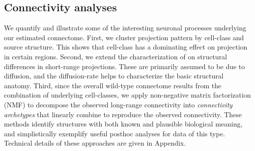 \documentclass[NETN,manuscript]{stjour-new}
\begin{document}


\subsection{Connectivity analyses}

We quantify and illustrate some of the interesting neuronal processes underlying our estimated connectome.
First, we cluster projection pattern by cell-class and source structure.
This shows that cell-class has a dominating effect on projection in certain regions.
Second, we extend the characterization of \citet{Knox2019-ot} on structural differences in short-range projections.
These are primarily assumed to be due to diffusion, and the diffusion-rate helps to characterize the basic structural anatomy.
Third, since the overall wild-type connectome results from the combination of underlying cell-classes, we apply non-negative matrix factorization (NMF) to decompose the observed long-range connectivity into \textit{connectivity archetypes} that linearly combine to reproduce the observed connectivity.
These methods identify structures with both known and plausible biological meaning, and simplistically exemplify useful posthoc analyses for data of this type.
Technical details of these approaches are given in Appendix.

\end{document}
